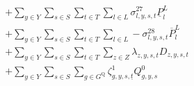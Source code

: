 \documentclass{article}
\newcommand{\sGenerators}{G}
\newcommand{\sGeneratorsExisting}{G^{\mathrm{E}}}
\newcommand{\sStorage}{G^{\mathrm{Q}}}
\newcommand{\sYears}{Y}
\newcommand{\sScenarios}{S}
\newcommand{\sIntervals}{T}
\newcommand{\sZones}{Z}
\newcommand{\sLinks}{L}
\newcommand{\iGenerator}{g}
\newcommand{\iYear}{y}
\newcommand{\iScenario}{s}
\newcommand{\iInterval}{t}
\newcommand{\iIntervalStart}{\underline{\iInterval}}
\newcommand{\iZone}{z}
\newcommand{\iLink}{l}
\newcommand{\cFixedOperationsMaintenanceCostGenerator}[1][\iGenerator]{C^{\mathrm{FOM}}_{#1}}
\newcommand{\cPowerOutputMax}[1][\iGenerator,\iYear]{\overline{P}_{#1}}
\newcommand{\cRampRateDown}[1][\iGenerator]{RD_{#1}}
\newcommand{\cDemand}[1][\iZone,\iYear,\iScenario,\iInterval]{D_{#1}}
\newcommand{\cPowerFlowMin}{\underline{P}_{\iLink}^{L}}
\newcommand{\cPowerFlowMax}{\overline{P}_{\iLink}^{L}}
\newcommand{\cRetirementIndicator}[1][\iGenerator,\iYear]{F_{#1}}
\newcommand{\cDiscountRate}[1][\iYear]{\delta_{#1}}
\newcommand{\cPowerInitial}[1][\iGenerator,\iYear,\iScenario]{P_{#1}^{0}}
\newcommand{\cPowerOutInitial}[1][\iGenerator,\iYear,\iScenario]{\hat{P}_{#1}^{\mathrm{out}}}
\newcommand{\cStorageEnergyInitial}[1][\iGenerator,\iYear,\iScenario]{Q_{#1}^{0}}
\newcommand{\cLostLoadPowerInitial}[1][\iZone,\iYear,\iScenario]{P_{#1}^{\mathrm{V}}}
\newcommand{\cPowerInInitial}[1][\iGenerator,\iYear,\iScenario]{\hat{P}_{#1}^{\mathrm{in}}}
\newcommand{\dRampRateDownStorageCharging}[1][\iGenerator,\iYear,\iScenario,\iInterval]{\sigma_{#1}^{24}}
\newcommand{\dRampRateDownStorageDischarging}[1][\iGenerator,\iYear,\iScenario,\iInterval]{\sigma_{#1}^{25}}
\newcommand{\dMinPowerFlow}[1][\iLink,\iYear,\iScenario,\iInterval]{\sigma_{#1}^{27}}
\newcommand{\dMaxPowerFlow}[1][\iLink,\iYear,\iScenario,\iInterval]{\sigma_{#1}^{28}}
\newcommand{\dPowerBalance}[1][\iZone,\iYear,\iScenario,\iInterval]{\lambda_{#1}}
\newcommand{\dStorageEnergyTransition}[1][\iGenerator,\iYear,\iScenario,\iInterval]{\zeta_{#1}^{1}}
\newcommand{\dGeneratorEnergyOutput}[1][\iGenerator,\iYear,\iScenario,\iInterval]{\zeta_{#1}^{2}}
\newcommand{\dStorageEnergyOutput}[1][\iGenerator,\iYear,\iScenario,\iInterval]{\zeta_{#1}^{3}}
\newcommand{\dLostLoadEnergy}[1][\iZone,\iYear,\iScenario,\iInterval]{\zeta_{#1}^{4}}
\begin{document}
\begin{align}
%
%
& + \sum\limits_{\iYear \in \sYears}\sum\limits_{\iScenario \in \sScenarios}\sum\limits_{\iInterval \in \sIntervals} \sum\limits_{\iLink \in \sLinks} \dMinPowerFlow \cPowerFlowMin\\
& + \sum\limits_{\iYear \in \sYears}\sum\limits_{\iScenario \in \sScenarios}\sum\limits_{\iInterval \in \sIntervals} \sum\limits_{\iLink \in \sLinks} - \dMaxPowerFlow \cPowerFlowMax\\
& + \sum\limits_{\iYear \in \sYears}\sum\limits_{\iScenario \in \sScenarios}\sum\limits_{\iInterval \in \sIntervals} \sum\limits_{\iZone \in \sZones} \dPowerBalance \cDemand\\
& + \sum\limits_{\iYear \in \sYears}\sum\limits_{\iScenario \in \sScenarios}\sum\limits_{\iGenerator \in \sStorage} \dStorageEnergyTransition[\iGenerator,\iYear,\iScenario,\iIntervalStart] \cStorageEnergyInitial\\

\end{align}
\end{document}
